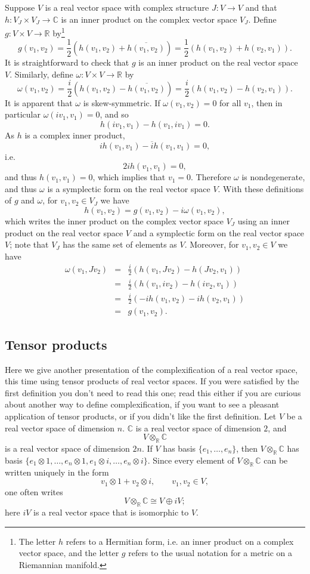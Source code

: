 \documentclass{article}
\begin{document}
Suppose $V$ is a real vector space with complex structure $J:V \to V$ and that $h:V_J \times V_J \to \mathbb{C}$ 
is an inner product on the complex vector space $V_J$. Define $g:V \times V \to \mathbb{R}$ by\footnote{The
letter $h$ refers to a Hermitian form, i.e. an inner product on a complex vector space, and the letter $g$ refers
to the usual notation for a metric on a Riemannian manifold.}
\[
g(v_1,v_2)=\frac{1}{2}\left(h(v_1,v_2)+\overline{h(v_1,v_2)}\right)=
\frac{1}{2}\left(h(v_1,v_2)+h(v_2,v_1)\right).
\]
It is straightforward to check that $g$ is an inner product on the real vector space $V$. 
Similarly, define $\omega:V \times V \to \mathbb{R}$ by
\[
\omega(v_1,v_2)=\frac{i}{2}\left(h(v_1,v_2)-\overline{h(v_1,v_2)}\right)=\frac{i}{2}\left(h(v_1,v_2)-h(v_2,v_1)\right).
\]
It is apparent that $\omega$ is skew-symmetric. If $\omega(v_1,v_2)=0$ for all $v_1$, then in particular
$\omega(iv_1,v_1)=0$, and so
\[
h(iv_1,v_1)-h(v_1,iv_1)=0.
\]
As $h$ is a complex inner product,
\[
ih(v_1,v_1)-\overline{i}h(v_1,v_1)=0,
\]
i.e.
\[
2ih(v_1,v_1)=0,
\]
and thus $h(v_1,v_1)=0$, which implies that $v_1=0$. Therefore $\omega$ is nondegenerate, and thus
$\omega$ is a symplectic form on the real vector space $V$. 
With these definitions of $g$ and $\omega$, for $v_1,v_2 \in V_J$ we have
\[
h(v_1,v_2)=g(v_1,v_2)-i\omega(v_1,v_2),
\]
which writes the inner product on the complex vector space $V_J$ using an inner product on the real
vector space $V$ and a symplectic form on the real vector space $V$;
note that $V_J$ has the same set of elements as $V$. 
Moreover, for $v_1,v_2 \in V$ we have
\begin{eqnarray*}
\omega(v_1,Jv_2)&=&\frac{i}{2}\left(h(v_1,Jv_2)-h(Jv_2,v_1)\right)\\
&=&\frac{i}{2}\left(h(v_1,iv_2)-h(iv_2,v_1)\right)\\
&=&\frac{i}{2}\left(-ih(v_1,v_2)-ih(v_2,v_1)\right)\\
&=&g(v_1,v_2).
\end{eqnarray*}


\subsection{Tensor products}
Here we give another presentation of the complexification of a real vector space, this time using tensor products
of real vector spaces. If you were satisfied by the first definition you don't need to read this one; read this either if you are curious
about another way to define complexification, if you want to see a pleasant application of tensor products, or if you didn't like the first
definition.
Let $V$ be a real vector space of dimension $n$. $\mathbb{C}$ is a real vector space of dimension $2$, and
\[
V \otimes_{\mathbb{R}} \mathbb{C}
\]
is a real vector space of dimension $2n$. If $V$ has basis $\{e_1,\ldots,e_n\}$, then $V \otimes_{\mathbb{R}} \mathbb{C}$
has basis $\{e_1 \otimes 1, \ldots, e_n \otimes 1, e_1 \otimes i, \ldots, e_n \otimes i\}$.
Since every element of $V \otimes_{\mathbb{R}} \mathbb{C}$ can be written uniquely in the form
\[
v_1 \otimes 1 + v_2 \otimes i, \qquad v_1, v_2 \in V,
\]
one often writes
\[
V \otimes_{\mathbb{R}} \mathbb{C} \cong V \oplus iV;
\]
here $iV$ is a real vector space that is isomorphic to $V$. 
\end{document}
